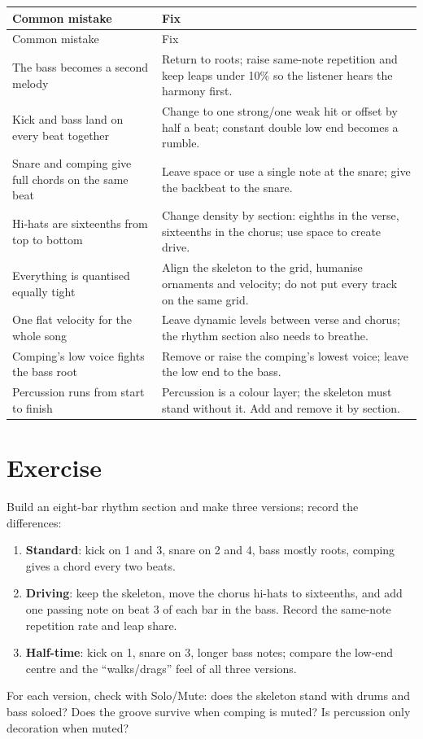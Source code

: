 \begin{longtable}{p{}p{}}
\toprule
Common mistake & Fix \\
\midrule
\endfirsthead
\toprule
Common mistake & Fix \\
\midrule
\endhead
The bass becomes a second melody & Return to roots; raise same-note repetition and keep leaps under 10\% so the listener hears the harmony first. \\
Kick and bass land on every beat together & Change to one strong/one weak hit or offset by half a beat; constant double low end becomes a rumble. \\
Snare and comping give full chords on the same beat & Leave space or use a single note at the snare; give the backbeat to the snare. \\
Hi-hats are sixteenths from top to bottom & Change density by section: eighths in the verse, sixteenths in the chorus; use space to create drive. \\
Everything is quantised equally tight & Align the skeleton to the grid, humanise ornaments and velocity; do not put every track on the same grid. \\
One flat velocity for the whole song & Leave dynamic levels between verse and chorus; the rhythm section also needs to breathe. \\
Comping's low voice fights the bass root & Remove or raise the comping's lowest voice; leave the low end to the bass. \\
Percussion runs from start to finish & Percussion is a colour layer; the skeleton must stand without it. Add and remove it by section. \\
\bottomrule
\end{longtable}

\section{Exercise}
\label{sec:rhythm-exercise}

\begin{exercise}
Build an eight-bar rhythm section and make three versions; record the differences:
\begin{enumerate}
\item \textbf{Standard}: kick on 1 and 3, snare on 2 and 4, bass mostly roots, comping gives a chord every two beats.
\item \textbf{Driving}: keep the skeleton, move the chorus hi-hats to sixteenths, and add one passing note on beat 3 of each bar in the bass. Record the same-note repetition rate and leap share.
\item \textbf{Half-time}: kick on 1, snare on 3, longer bass notes; compare the low-end centre and the ``walks/drags'' feel of all three versions.
\end{enumerate}
For each version, check with Solo/Mute: does the skeleton stand with drums and bass soloed? Does the groove survive when comping is muted? Is percussion only decoration when muted?
\end{exercise}


